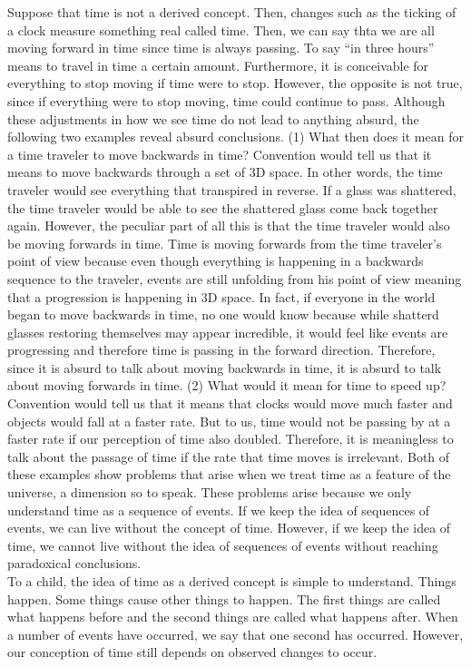 \documentclass[a4paper, 12pt]{article}
\begin{document}
Suppose that time is not a derived concept. Then, changes such as the ticking of a clock measure something real called time. Then, we can say thta we are all moving forward in time since time is always passing. To say ``in three hours'' means to travel in time a certain amount. Furthermore, it is conceivable for everything to stop moving if time were to stop. However, the opposite is not true, since if everything were to stop moving, time could continue to pass. Although these adjustments in how we see time do not lead to anything absurd, the following two examples reveal absurd conclusions. (1) What then does it mean for a time traveler to move backwards in time? Convention would tell us that it means to move backwards through a set of 3D space. In other words, the time traveler would see everything that transpired in reverse. If a glass was shattered, the time traveler would be able to see the shattered glass come back together again. However, the peculiar part of all this is that the time traveler would also be moving forwards in time. Time is moving forwards from the time traveler's point of view because even though everything is happening in a backwards sequence to the traveler, events are still unfolding from his point of view meaning that a progression is happening in 3D space. In fact, if everyone in the world began to move backwards in time, no one would know because while shatterd glasses restoring themselves may appear incredible, it would feel like events are progressing and therefore time is passing in the forward direction. Therefore, since it is absurd to talk about moving backwards in time, it is absurd to talk about moving forwards in time. (2) What would it mean for time to speed up? Convention would tell us that it means that clocks would move much faster and objects would fall at a faster rate. But to us, time would not be passing by at a faster rate if our perception of time also doubled. Therefore, it is meaningless to talk about the passage of time if the rate that time moves is irrelevant. Both of these examples show problems that arise when we treat time as a feature of the universe, a dimension so to speak. These problems arise because we only understand time as a sequence of events. If we keep the idea of sequences of events, we can live without the concept of time. However, if we keep the idea of time, we cannot live without the idea of sequences of events without reaching paradoxical conclusions. \\
\break
To a child, the idea of time as a derived concept is simple to understand. Things happen. Some things cause other things to happen. The first things are called what happens before and the second things are called what happens after. When a number of events have occurred, we say that one second has occurred. However, our conception of time still depends on observed changes to occur. \\
\end{document}
